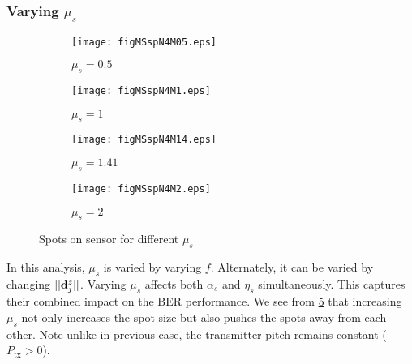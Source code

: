\subsubsection{Varying $\mu_{s}$}
\label{subsubsec:osmResultsMu}
\begin{figure}[!t]
	\centering
		\begin{subfigure}{0.49\textwidth}
			\centering
			\texttt{[image: figMSspN4M05.eps]}
			\caption{$\mu_{s}=0.5$}
			\label{figMSspN4M05}
		\end{subfigure}
		\hfill
		\begin{subfigure}{0.49\textwidth}
			\centering
			\texttt{[image: figMSspN4M1.eps]}
			\caption{$\mu_{s}=1$}
			\label{figMSspN4M1}
		\end{subfigure}
		\vfill
		\begin{subfigure}{0.49\textwidth}
			\centering
			\texttt{[image: figMSspN4M14.eps]}
			\caption{$\mu_{s}=1.41$}
			\label{figMSspN4M14}
		\end{subfigure}
		\hfill
		\begin{subfigure}{0.49\textwidth}
			\centering
		\texttt{[image: figMSspN4M2.eps]}
			\caption{$\mu_{s}=2$}
			\label{figMSspN4M2}
		\end{subfigure}
		\caption{Spots on sensor for different $\mu_{s}$}
		\label{figMSSpots}
\end{figure}


In this analysis, $\mu_{s}$ is varied by varying $f$. Alternately, it can be varied by changing $||{\bf{d}}^{z}_{j}||$. Varying $\mu_{s}$ affects both $\alpha_{s}$ and $\eta_{s}$ simultaneously. This captures their combined impact on the BER performance. We see from \figurename{ \ref{figMSSpots}} that increasing $\mu_{s}$ not only increases the spot size but also pushes the spots away from each other. Note unlike in previous case, the transmitter pitch remains constant ($P_{\text{tx}}>0$).

